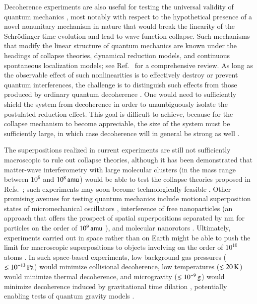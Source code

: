 \documentclass[3p,sort&compress]{elsarticle}
\begin{document}
Decoherence experiments are also useful for testing the universal validity of quantum mechanics \cite{Leggett:2002:uy,Marshall:2003:om,Bassi:2005:om,Pikovski:2012:aa,Arndt:2014:oo,Wan:2016:oo,Kaltenbaek:2016:pp,Stickler:2018:ii}, most notably with respect to the hypothetical presence of a novel nonunitary mechanism in nature that would break the linearity of the Schr\"odinger time evolution and lead to wave-function collapse. Such mechanisms that modify the linear structure of quantum mechanics are known under the headings of collapse theories, dynamical reduction models, and continuous spontaneous localization models; see Ref.~\cite{Bassi:2003:yb} for a comprehensive review. As long as the observable effect of such nonlinearities is to effectively destroy or prevent quantum interferences, the challenge is to distinguish such effects from those produced by ordinary quantum decoherence \cite{Adler:2007:um,Bassi:2010:aa}. One would need to sufficiently shield the system from decoherence in order to unambiguously isolate the postulated reduction effect. This goal is difficult to achieve, because for the collapse mechanism to become appreciable, the size of the system must be sufficiently large, in which case decoherence will in general be strong as well \cite{Tegmark:1993:uz,Nimmrichter:2013:aa}. 

The superpositions realized in current experiments are still not sufficiently macroscopic to rule out collapse theories, although it has been demonstrated \cite{Nimmrichter:2011:pr} that matter-wave interferometry with large molecular clusters (in the mass range between $10^6$ and $\unit[10^8]{amu}$) would be able to test the collapse theories proposed in Refs.~\cite{Adler:2007:um,Bassi:2010:aa}; such experiments may soon become technologically feasible \cite{Hornberger:2012:ii,Arndt:2014:oo}. Other promising avenues for testing quantum mechanics include motional superposition states of micromechanical oscillators \cite{Marshall:2003:om,Pikovski:2012:aa}, interference of free nanoparticles \cite{Romero:2011:aa,Wan:2016:oo} (an approach that offers the prospect of spatial superpositions separated by \unit[100]{nm} for particles on the order of $\unit[10^9]{amu}$ \cite{Wan:2016:oo}), and molecular nanorotors \cite{Stickler:2018:ii}. Ultimately, experiments carried out in space rather than on Earth might be able to push the limit for macroscopic superpositions to objects involving on the order of $10^{10}$ atoms \cite{Kaltenbaek:2016:pp}. In such space-based experiments, low background gas pressures ($\lesssim \unit[10^{-13}]{Pa}$) would minimize collisional decoherence, low temperatures ($\lesssim \unit[20]{K}$) would minimize thermal decoherence, and microgravity ($\lesssim \unit[10^{-9}]{g}$) would minimize decoherence induced by gravitational time dilation \cite{Pikovski:2015:oo}, potentially enabling tests of quantum gravity models \cite{Kaltenbaek:2016:pp}.
\end{document}
